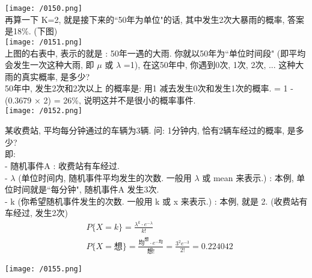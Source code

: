 \documentclass[UTF8]{ctexart}
\begin{document}
\begin{myEnvSample}
		\texttt{[image: /0150.png]} \\
		
		再算一下 K=2, 就是接下来的``50年为单位"的话, 其中发生2次大暴雨的概率, 答案是18\%. (下图) \\
		
		\texttt{[image: /0151.png]} \\	
		
		上图的右表中, 表示的就是 :  50年一遇的大雨. 你就以50年为``单位时间段" (即平均会发生一次这种大雨, 即 $\mu$ 或 $\lambda$ =1), 在这50年中, 你遇到0次, 1次, 2次, ...​ 这种大雨的真实概率, 是多少? \\
		
		50年中, 发生2次和2次以上 的概率是: 用1 减去发生0次和发生1次的概率. = 1 - (0.3679 × 2) = 26\%, 说明这并不是很小的概率事件. \\
		
		\texttt{[image: /0152.png]} 
	\end{myEnvSample}
	\vspace{1em} 
	
	
	
	
	\begin{myEnvSample}
		某收费站, 平均每分钟通过的车辆为3辆. 问: 1分钟内, 恰有2辆车经过的概率, 是多少? \\
		即: \\
		- 随机事件A : 收费站有车经过. \\
		- $\lambda$ (单位时间内, 随机事件平均发生的次数. 一般用 $\lambda$ 或 mean 来表示.) : 本例, 单位时间就是``每分钟", 随机事件A 发生3次. \\
		- k (你希望随机事件发生的次数. 一般用 k 或 x 来表示.) : 本例, 就是 2. (收费站有车经过, 发生2次) 
\begin{align*}  %
	&P\{X=k\}=\frac{\lambda ^k\cdot e^{-\lambda}}{k!}\\
&P\{X=\text{想\}}=\frac{\text{均}^{\text{想}}\cdot e^{-\text{均}}}{\text{想!}}=\frac{3^2e^{-3}}{2!}=0.224042
\end{align*}

	\texttt{[image: /0155.png]} 	
	\end{myEnvSample}
	\vspace{1em} 
	
	
	
\end{document}
